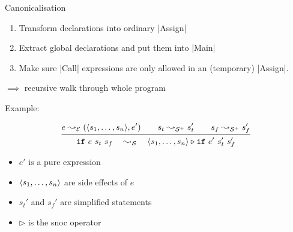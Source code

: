 \begin{frame}[fragile]{Canonicalisation}

  \begin{enumerate}
    \item Transform declarations into ordinary |Assign|
    \item Extract global declarations and put them into |Main|
    \item Make sure |Call| expressions are only allowed in an (temporary) |Assign|.
  \end{enumerate}

  \pause

  $\implies$ recursive walk through whole program

\end{frame}

\begin{frame}[fragile]{Example: \If}

  \begin{gather*}
    e \leadsto_\Exp (\< s_1, \dots, s_n \>, e') \qquad 
    s_t \leadsto_\Stms s_t' \qquad
    s_f \leadsto_\Stms s_f' \\
    \midrule
    \If\ e\ s_t\ s_f \quad\leadsto_\Stm\quad \< s_1, \dots, s_n \>
                               \triangleright \If\ e'\ s_t'\ s_f'
  \end{gather*}

  \begin{itemize}
      \item $e'$ is a pure expression
      \item $\langle s_1, \dots, s_n \rangle$ are side effects of $e$
      \item $s_t'$ and $s_f'$ are simplified statements
      \item $\triangleright$ is the snoc operator
  \end{itemize}

  \pause

  \begin{block}{}
  \end{block}

\end{frame}

